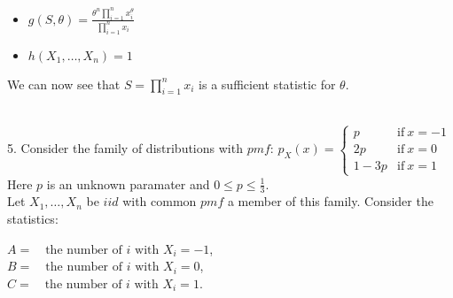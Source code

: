 \documentclass[12pt]{article}
\newcommand{\XB}{\color{black}}
\newcommand{\XBB}{\color{blue}}
\newcommand{\XV}{\color{violet}}
\begin{document}
\begin{itemize}
    \item $ \displaystyle g(S, \theta) = \frac{ \theta^{n} \prod_{i=1}^{n} x_{i}^{\theta} }{ \prod_{i=1}^{n} x_{i} } $
    \item $ \displaystyle h(X_{1}, \dots , X_{n}) = 1 $
\end{itemize}

\noindent
We can now see that $ \displaystyle S = \prod_{i=1}^{n} x_{i} $ is a sufficient statistic for $ \theta $.



\newpage
\XBB\hrulefill\XB \\

5. Consider the family of distributions with $ \displaystyle pmf $: $p_{X}(x) = 
\begin{cases} 
    p & \text{if} \  x = -1 \\
    2p &  \text{if} \ x = 0 \\
    1 - 3p & \text{if} \ x = 1
\end{cases} $ \\ 

Here $ p $ is an unknown paramater and $ \displaystyle 0 \leq p \leq \frac{1}{3} $. \\

Let $ X_{1},\dots,X_{n} $ be $ iid $ with common $ pmf $ a member of this family. Consider the statistics: 
\begin{center}
    $ A = \quad \text{the number of $i$ with } X_{i} = -1 $, \\
    $ B = \quad \text{the number of $i$ with } X_{i} = 0 $, \\
    $ C = \quad \text{the number of $i$ with } X_{i} = 1 $. \\
\end{center}

\XBB\hrulefill\XB 
\vspace{5mm} \\


\end{document}
